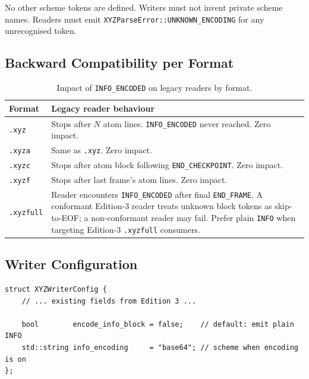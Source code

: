 \documentclass[12pt, a4paper, oneside]{article}
\newcommand{\type}[1]{\texttt{#1}}
\begin{document}
No other scheme tokens are defined.  Writers must not invent private scheme names.
Readers must emit \type{XYZParseError::UNKNOWN\_ENCODING} for any unrecognised token.

\subsection{Backward Compatibility per Format}

\begin{table}[htbp]
  \centering
  \caption{Impact of \texttt{INFO\_ENCODED} on legacy readers by format.}
  \label{tab:enc_compat}
  \begin{tabular}{lp{9.5cm}}
    \toprule
    Format & Legacy reader behaviour \\
    \midrule
    \texttt{.xyz}     & Stops after $N$ atom lines.  \texttt{INFO\_ENCODED} never reached.
                        Zero impact. \\
    \texttt{.xyza}    & Same as \texttt{.xyz}.  Zero impact. \\
    \texttt{.xyzc}    & Stops after atom block following \texttt{END\_CHECKPOINT}.
                        Zero impact. \\
    \texttt{.xyzf}    & Stops after last frame's atom lines.  Zero impact. \\
    \texttt{.xyzfull} & Reader encounters \texttt{INFO\_ENCODED} after final
                        \texttt{END\_FRAME}.  A conformant Edition-3 reader treats
                        unknown block tokens as skip-to-EOF; a non-conformant reader
                        may fail.  Prefer plain \texttt{INFO} when targeting
                        Edition-3 \texttt{.xyzfull} consumers. \\
    \bottomrule
  \end{tabular}
\end{table}

\subsection{Writer Configuration}

\begin{lstlisting}
struct XYZWriterConfig {
    // ... existing fields from Edition 3 ...

    bool        encode_info_block = false;    // default: emit plain INFO
    std::string info_encoding     = "base64"; // scheme when encoding is on
};
\end{lstlisting}
\end{document}
